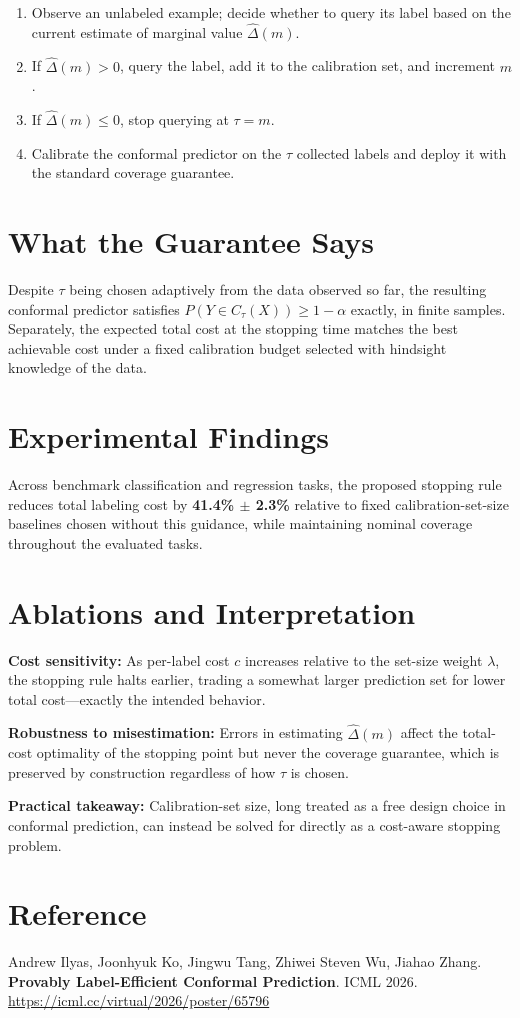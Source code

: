 \documentclass[10pt,twocolumn]{article}
\begin{document}
\begin{enumerate}[itemsep=2pt,parsep=0pt]
  \item Observe an unlabeled example; decide whether to query its
    label based on the current estimate of marginal value
    $\widehat\Delta(m)$.
  \item If $\widehat\Delta(m) > 0$, query the label, add it to the
    calibration set, and increment $m$.
  \item If $\widehat\Delta(m) \le 0$, stop querying at $\tau = m$.
  \item Calibrate the conformal predictor on the $\tau$ collected
    labels and deploy it with the standard coverage guarantee.
\end{enumerate}

\section{What the Guarantee Says}

Despite $\tau$ being chosen adaptively from the data observed so far,
the resulting conformal predictor satisfies
$P(Y \in C_\tau(X)) \ge 1-\alpha$ exactly, in finite samples. Separately,
the expected total cost at the stopping time matches the best
achievable cost under a fixed calibration budget selected with
hindsight knowledge of the data.

\section{Experimental Findings}

Across benchmark classification and regression tasks, the proposed
stopping rule reduces total labeling cost by \textbf{41.4\% $\pm$ 2.3\%}
relative to fixed calibration-set-size baselines chosen without this
guidance, while maintaining nominal coverage throughout the evaluated
tasks.

\section{Ablations and Interpretation}

\textbf{Cost sensitivity:} As per-label cost $c$ increases relative to
the set-size weight $\lambda$, the stopping rule halts earlier,
trading a somewhat larger prediction set for lower total cost---exactly
the intended behavior.

\textbf{Robustness to misestimation:} Errors in estimating
$\widehat\Delta(m)$ affect the total-cost optimality of the stopping
point but never the coverage guarantee, which is preserved by
construction regardless of how $\tau$ is chosen.

\textbf{Practical takeaway:} Calibration-set size, long treated as a
free design choice in conformal prediction, can instead be solved for
directly as a cost-aware stopping problem.

\section*{Reference}

Andrew Ilyas, Joonhyuk Ko, Jingwu Tang, Zhiwei Steven Wu, Jiahao Zhang.
\textbf{Provably Label-Efficient Conformal Prediction}.
ICML 2026.
\url{https://icml.cc/virtual/2026/poster/65796}
\end{document}
